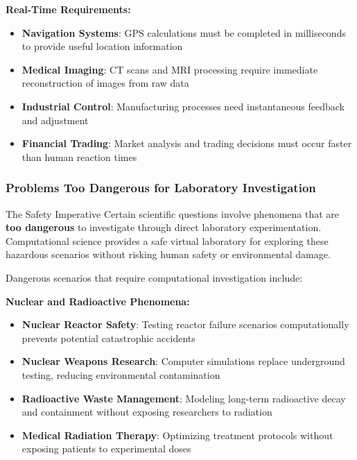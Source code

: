 \textbf{Real-Time Requirements:}
\begin{itemize}
    \item \textbf{Navigation Systems}: GPS calculations must be completed in milliseconds to provide useful location information
    \item \textbf{Medical Imaging}: CT scans and MRI processing require immediate reconstruction of images from raw data
    \item \textbf{Industrial Control}: Manufacturing processes need instantaneous feedback and adjustment
    \item \textbf{Financial Trading}: Market analysis and trading decisions must occur faster than human reaction times
\end{itemize}

\subsubsection{Problems Too Dangerous for Laboratory Investigation}

\begin{warningbox}{The Safety Imperative}
Certain scientific questions involve phenomena that are \textbf{too dangerous} to investigate through direct laboratory experimentation. Computational science provides a safe virtual laboratory for exploring these hazardous scenarios without risking human safety or environmental damage.
\end{warningbox}

Dangerous scenarios that require computational investigation include:

\textbf{Nuclear and Radioactive Phenomena:}
\begin{itemize}
    \item \textbf{Nuclear Reactor Safety}: Testing reactor failure scenarios computationally prevents potential catastrophic accidents
    \item \textbf{Nuclear Weapons Research}: Computer simulations replace underground testing, reducing environmental contamination
    \item \textbf{Radioactive Waste Management}: Modeling long-term radioactive decay and containment without exposing researchers to radiation
    \item \textbf{Medical Radiation Therapy}: Optimizing treatment protocols without exposing patients to experimental doses
\end{itemize}


